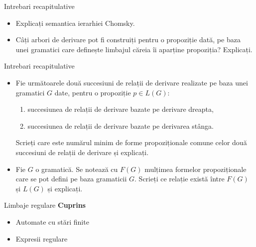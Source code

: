 \documentclass[pdf]{beamer}
\begin{document}
\begin{frame}{Intrebari recapitulative}
\begin{itemize}

\item
Explicați semantica ierarhiei Chomsky.
\newline

\item
Câți arbori de derivare pot fi construiți pentru o propoziție dată, pe baza unei gramatici care definește limbajul căreia îi aparține propoziția? Explicați.
\newline

\end{itemize}
\end{frame}



\begin{frame}{Intrebari recapitulative}
\begin{itemize}

\item
Fie următoarele două succesiuni de relații de derivare realizate pe baza unei gramatici $G$ date, pentru o propoziție $p \in L(G)$:

\begin{enumerate}
\item
succesiunea de relații de derivare bazate pe derivare dreapta,
\item
succesiunea de relații de derivare bazate pe derivarea stânga.
\end{enumerate}

Scrieți care este numărul minim de forme propoziționale comune celor două succesiuni de relații de derivare și explicați.
\newline

\item
Fie $G$ o gramatică. Se notează cu $F(G)$ mulțimea formelor propoziționale care se pot defini pe baza gramaticii $G$. Scrieți ce relație există între $F(G)$ și $L(G)$ și explicați.

\end{itemize}
\end{frame}






\begin{frame}{Limbaje regulare}
\textbf{Cuprins}
\begin{itemize}
\item
Automate cu stări finite
\item
Expresii regulare
\end{itemize}
\end{frame}
\end{document}
